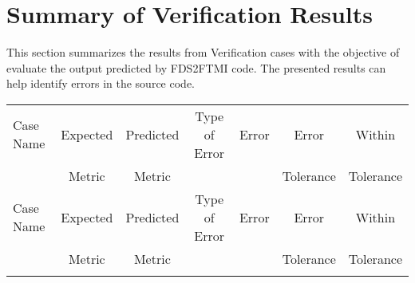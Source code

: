\documentclass[11pt]{book}
\begin{document}
\section{Summary of Verification Results}

This section summarizes the results from Verification cases with the objective of evaluate the output predicted by FDS2FTMI code. The presented results can help identify errors in the source code.

\begin{longtable}[c]{l c c c c c c }
\hline
Case Name & Expected & Predicted & Type of Error & Error & Error     & Within    \\
          & Metric   & Metric    &               &       & Tolerance & Tolerance \\ \hline \hline
\endfirsthead
\hline
Case Name & Expected & Predicted & Type of Error & Error & Error     & Within    \\
          & Metric   & Metric    &               &       & Tolerance & Tolerance \\ \hline \hline
\endhead
\hline
\endfoot
\hline
\endlastfoot

\end{longtable}


\end{document}

